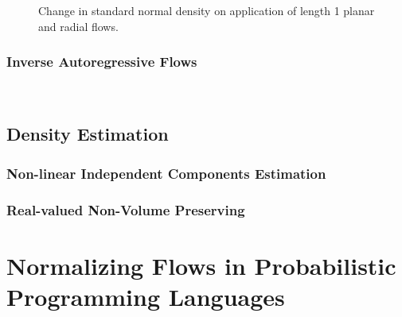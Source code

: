 \documentclass[runningheads]{llncs}
\begin{document}
\begin{figure}
	\centering
	\caption{Change in standard normal density on application of length 1 planar and radial flows.}
	\label{fig:planarradial}
\end{figure}

\subsubsection{Inverse Autoregressive Flows}
~\cite{kingma2016improved}


\subsection{Density Estimation}

\subsubsection{Non-linear Independent Components Estimation}
\subsubsection{Real-valued Non-Volume Preserving}

\section{Normalizing Flows in Probabilistic Programming Languages}
~\cite{dillon2017tensorflow}
\end{document}

